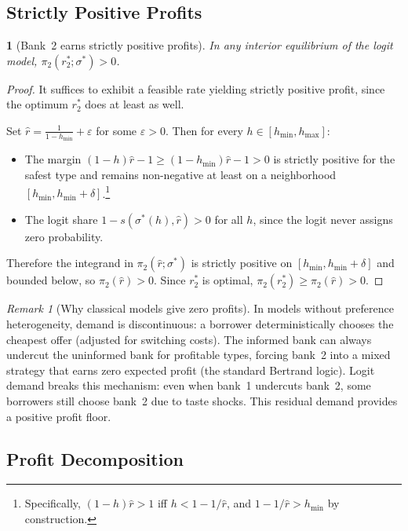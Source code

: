 \documentclass[12pt]{article}
\theoremstyle{plain}
\theoremstyle{plain}
\newtheorem{prop}[thm]{\protect\propositionname}
\theoremstyle{definition}  %
\theoremstyle{remark}  %
\newtheorem{remark}[thm]{Remark}  %
\providecommand{\propositionname}{Proposition}
\begin{document}
\subsection{Strictly Positive Profits}

\begin{prop}[Bank~2 earns strictly positive profits]\label{prop:b2positive}
In any interior equilibrium of the logit model, $\pi_2(r_2^*; \sigma^*) > 0$.
\end{prop}

\begin{proof}
It suffices to exhibit a feasible rate yielding strictly positive profit, since the optimum $r_2^*$ does at least as well.

Set $\hat{r} = \frac{1}{1 - h_{\min}} + \varepsilon$ for some $\varepsilon > 0$. Then for every $h \in [h_{\min}, h_{\max}]$:
\begin{itemize}
    \item The margin $(1-h)\hat{r} - 1 \geq (1-h_{\min})\hat{r} - 1 > 0$ is strictly positive for the safest type and remains non-negative at least on a neighborhood $[h_{\min}, h_{\min} + \delta]$.\footnote{Specifically, $(1-h)\hat{r} > 1$ iff $h < 1 - 1/\hat{r}$, and $1 - 1/\hat{r} > h_{\min}$ by construction.}
    \item The logit share $1 - s(\sigma^*(h), \hat{r}) > 0$ for all $h$, since the logit never assigns zero probability.
\end{itemize}
Therefore the integrand in $\pi_2(\hat{r}; \sigma^*)$ is strictly positive on $[h_{\min}, h_{\min} + \delta]$ and bounded below, so $\pi_2(\hat{r}) > 0$. Since $r_2^*$ is optimal, $\pi_2(r_2^*) \geq \pi_2(\hat{r}) > 0$.
\end{proof}

\begin{remark}[Why classical models give zero profits]
In models without preference heterogeneity, demand is discontinuous: a borrower deterministically chooses the cheapest offer (adjusted for switching costs). The informed bank can always undercut the uninformed bank for profitable types, forcing bank~2 into a mixed strategy that earns zero expected profit (the standard Bertrand logic). Logit demand breaks this mechanism: even when bank~1 undercuts bank~2, some borrowers still choose bank~2 due to taste shocks. This residual demand provides a positive profit floor.
\end{remark}

\subsection{Profit Decomposition}
\end{document}

